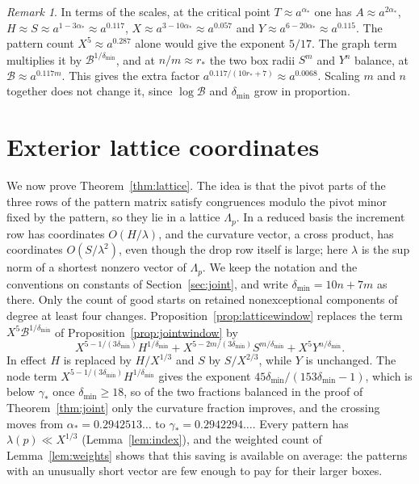 \documentclass[11pt]{article}
\theoremstyle{definition}
\theoremstyle{remark}
\newtheorem{remark}[theorem]{Remark}
\begin{document}
\begin{remark}\label{rem:jointscales}
In terms of the scales, at the critical point $T\approx a^{\alpha_*}$ one has
$A\approx a^{2\alpha_*}$, $H\approx S\approx a^{1-3\alpha_*}\approx a^{0.117}$,
$X\approx a^{3-10\alpha_*}\approx a^{0.057}$ and
$Y\approx a^{6-20\alpha_*}\approx a^{0.115}$. The pattern count $X^5\approx a^{0.287}$
alone would give the exponent $5/17$. The graph term multiplies it by
$\mathcal B^{1/\delta_{\min}}$, and at $n/m\approx r_*$ the two box radii $S^m$ and $Y^n$
balance, at $\mathcal B\approx a^{0.117m}$. This gives the extra factor
$a^{0.117/(10r_*+7)}\approx a^{0.0068}$. Scaling $m$ and $n$ together does not
change it, since $\log\mathcal B$ and $\delta_{\min}$ grow in proportion.
\end{remark}

\section{Exterior lattice coordinates}\label{sec:lattice}

We now prove Theorem~\ref{thm:lattice}. The idea is that the pivot parts of the three rows of
the pattern matrix satisfy congruences modulo the pivot minor fixed by the pattern, so they
lie in a lattice $\Lambda_p$. In a reduced basis the increment row has coordinates
$O(H/\lambda)$, and the curvature vector, a cross product, has coordinates
$O(S/\lambda^2)$, even though the drop row itself is large; here $\lambda$ is the sup norm of
a shortest nonzero vector of $\Lambda_p$. We keep the notation and the conventions on constants
of Section~\ref{sec:joint}, and write $\delta_{\min}=10n+7m$ as there. Only the count of
good starts on retained nonexceptional components of degree at least four changes.
Proposition~\ref{prop:latticewindow} replaces the term $X^5\mathcal B^{1/\delta_{\min}}$ of
Proposition~\ref{prop:jointwindow} by
\[
 X^{5-1/(3\delta_{\min})}H^{1/\delta_{\min}}+X^{5-2m/(3\delta_{\min})}S^{m/\delta_{\min}}+X^5Y^{n/\delta_{\min}}.
\]
In effect $H$ is
replaced by $H/X^{1/3}$ and $S$ by $S/X^{2/3}$, while $Y$ is unchanged. The node term $X^{5-1/(3\delta_{\min})}H^{1/\delta_{\min}}$ gives the exponent
$45\delta_{\min}/(153\delta_{\min}-1)$, which is below $\gamma_*$ once
$\delta_{\min}\ge18$, so of the two fractions balanced in the proof of
Theorem~\ref{thm:joint} only the curvature fraction improves, and the crossing moves from
$\alpha_*=0.2942513\ldots$ to $\gamma_*=0.2942294\ldots$. Every pattern has
$\lambda(p)\ll X^{1/3}$ (Lemma~\ref{lem:index}), and the weighted count of
Lemma~\ref{lem:weights} shows that this saving is available on average: the patterns with an
unusually short vector are few enough to pay for their larger boxes.
\end{document}
